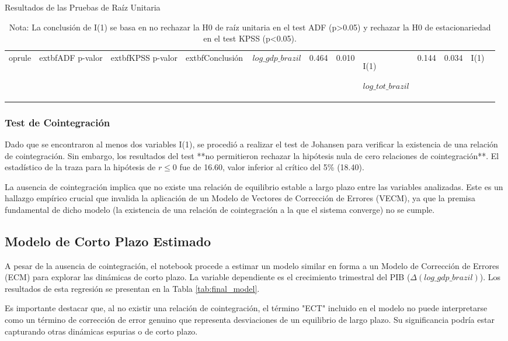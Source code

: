 \documentclass[12pt, a4paper]{article}
\begin{document}
\begin{table}[h!]
\centering
\caption{Resultados de las Pruebas de Raíz Unitaria}
\label{tab:unit_root}
\begin{tabular}{lccc}
	oprule
 & 	 extbf{ADF p-valor} & 	 extbf{KPSS p-valor} & 	 extbf{Conclusión} 
\
\midrule
$log\_gdp\_brazil$ & 0.464 & 0.010 & I(1) 

$log\_tot\_brazil$ & 0.144 & 0.034 & I(1) 
\
\bottomrule
\end{tabular}
\caption*{Nota: La conclusión de I(1) se basa en no rechazar la H0 de raíz unitaria en el test ADF (p>0.05) y rechazar la H0 de estacionariedad en el test KPSS (p<0.05).}
\end{table}

\subsubsection{Test de Cointegración}
Dado que se encontraron al menos dos variables I(1), se procedió a realizar el test de Johansen para verificar la existencia de una relación de cointegración. Sin embargo, los resultados del test **no permitieron rechazar la hipótesis nula de cero relaciones de cointegración**. El estadístico de la traza para la hipótesis de $r \le 0$ fue de 16.60, valor inferior al crítico del 5\% (18.40).

La ausencia de cointegración implica que no existe una relación de equilibrio estable a largo plazo entre las variables analizadas. Este es un hallazgo empírico crucial que invalida la aplicación de un Modelo de Vectores de Corrección de Errores (VECM), ya que la premisa fundamental de dicho modelo (la existencia de una relación de cointegración a la que el sistema converge) no se cumple.

\subsection{Modelo de Corto Plazo Estimado}
A pesar de la ausencia de cointegración, el notebook procede a estimar un modelo similar en forma a un Modelo de Corrección de Errores (ECM) para explorar las dinámicas de corto plazo. La variable dependiente es el crecimiento trimestral del PIB ($\Delta(log\_gdp\_brazil)$). Los resultados de esta regresión se presentan en la Tabla \ref{tab:final_model}.

Es importante destacar que, al no existir una relación de cointegración, el término "ECT" incluido en el modelo no puede interpretarse como un término de corrección de error genuino que representa desviaciones de un equilibrio de largo plazo. Su significancia podría estar capturando otras dinámicas espurias o de corto plazo.
\end{document}
